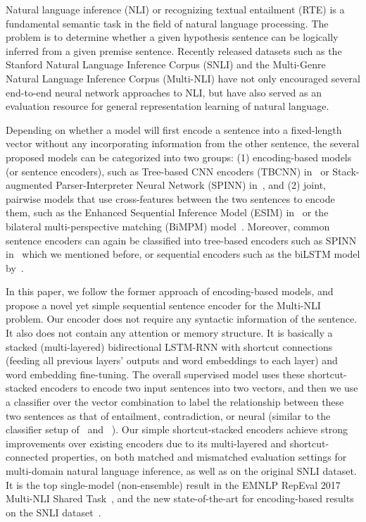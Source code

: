 \documentclass[11pt,letterpaper]{article}
\begin{document}
Natural language inference (NLI) or recognizing textual entailment (RTE) is a fundamental semantic task in the field of natural language processing. The problem is to determine whether a given hypothesis sentence can be logically inferred from a given premise sentence.
%
Recently released datasets such as the Stanford Natural Language Inference Corpus \cite{snli:emnlp2015} (SNLI) and the Multi-Genre Natural Language Inference Corpus \cite{williams2017broad} (Multi-NLI) have not only encouraged several end-to-end neural network approaches to NLI, but have also served as an evaluation resource for general representation learning of natural language.

Depending on whether a model will first encode a sentence into a fixed-length vector without any incorporating information from the other sentence, 
the several proposed models can be categorized into two groups: (1) encoding-based models (or sentence encoders), such as Tree-based CNN encoders (TBCNN) in~ or Stack-augmented Parser-Interpreter Neural Network (SPINN) in~, and (2) joint, pairwise models that use cross-features between the two sentences to encode them, such as the Enhanced Sequential Inference Model (ESIM) in~ or the bilateral multi-perspective matching (BiMPM) model~. Moreover, common sentence encoders can again be classified into tree-based encoders such as SPINN in~ which we mentioned before, or sequential encoders such as the biLSTM model by~.

In this paper, we follow the former approach of encoding-based models, and propose a novel yet simple sequential sentence encoder for the Multi-NLI problem. Our encoder does not require any syntactic information of the sentence. It also does not contain any attention or memory structure. It is basically a stacked (multi-layered) bidirectional LSTM-RNN with shortcut connections (feeding all previous layers' outputs and word embeddings to each layer) and word embedding fine-tuning. The overall supervised  model uses these shortcut-stacked encoders to encode two input sentences into two vectors, and then we use a classifier over the vector combination to label the relationship between these two sentences as that of entailment, contradiction, or neural (similar to the classifier setup of~ and ~). 
Our simple shortcut-stacked encoders achieve strong improvements over existing encoders due to its multi-layered and shortcut-connected properties, on both matched and mismatched evaluation settings for multi-domain natural language inference, as well as on the original SNLI dataset. It is the top single-model (non-ensemble) result in the EMNLP RepEval 2017 Multi-NLI Shared Task~\cite{nangia2017repeval}, and the new state-of-the-art for encoding-based results on the SNLI dataset~\cite{snli:emnlp2015}.
\end{document}
